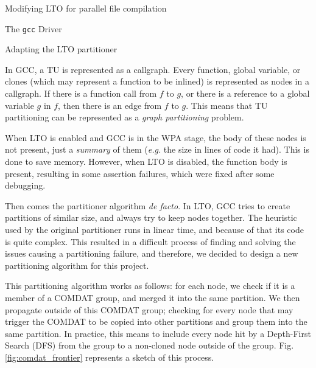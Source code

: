 \begin{section}{Modifying LTO for parallel file compilation}
\begin{subsection}{The \texttt{gcc} Driver}
\end{subsection}

\begin{subsection}{Adapting the LTO partitioner}\label{sec:lto_partitioner}

In GCC, a TU is represented as a callgraph. Every function, global variable, or
clones (which may represent a function to be inlined) is represented as nodes
in a callgraph. If there is a function call from $f$ to $g$, or there is a
reference to a global variable $g$ in $f$, then there is an edge from $f$ to
$g$. This means that TU partitioning can be represented as a \emph{graph
partitioning} problem.

When LTO is enabled and GCC is in the WPA stage, the body of these nodes
is not present, just a \textit{summary} of them (\textit{e.g.} the size
in lines of code it had). This is done to save memory. However,
when LTO is disabled, the function body is present, resulting
in some assertion failures, which were fixed after some debugging.

Then comes the partitioner algorithm \textit{de facto}. In LTO, GCC tries to
create partitions of similar size, and always try to keep nodes together. The
heuristic used by the original partitioner runs in linear time, and because of
that its code is quite complex. This resulted in a difficult process of finding
and solving the issues causing a partitioning failure, and therefore, we
decided to design a new partitioning algorithm for this project.

This partitioning algorithm works as follows: for each node, we check if it
is a member of a COMDAT \cite{comdat} group, and
merged it into the same partition. We then propagate outside of this COMDAT group;
checking for every node that may trigger the COMDAT to be copied into other
partitions and group them into the same partition. In practice,
this means to include every node hit by a Depth-First
Search (DFS) from the group to a non-cloned node outside of the group.
Fig. \ref{fig:comdat_frontier} represents a sketch of this process.


\end{subsection}
\end{section}
